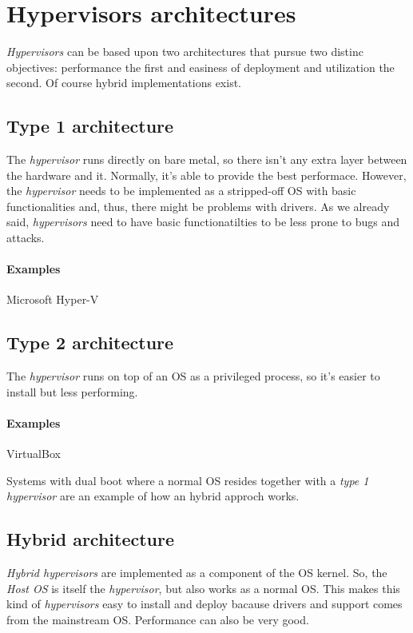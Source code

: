 \section{Hypervisors architectures}
\emph{Hypervisors} can be based upon two architectures that pursue two
distinc objectives: performance the first and easiness of deployment
and utilization the second. Of course hybrid implementations exist.

\subsection{Type 1 architecture}
The \emph{hypervisor} runs directly on bare metal, so there isn't any extra
layer between the hardware and it. Normally, it's able to provide the best
performace. However, the \emph{hypervisor} needs to be implemented as a
stripped-off OS with basic functionalities and, thus, there might be problems
with drivers. As we already said, \emph{hypervisors} need to have basic
functionatilties to be less prone to bugs and attacks.

\paragraph{Examples} Microsoft Hyper-V

\subsection{Type 2 architecture}
The \emph{hypervisor} runs on top of an OS as a privileged process, so it's
easier to install but less performing.

\paragraph{Examples} VirtualBox

\begin{note}
    Systems with dual boot where a normal OS resides together with a \emph{type
    1 hypervisor} are an example of how an hybrid approch works.
\end{note}

\subsection{Hybrid architecture}
\emph{Hybrid hypervisors} are implemented as a component of the OS kernel.
So, the \emph{Host OS} is itself the \emph{hypervisor}, but also works as a
normal OS. This makes this kind of \emph{hypervisors} easy to install and deploy
bacause drivers and support comes from the mainstream OS. Performance can also
be very good.

